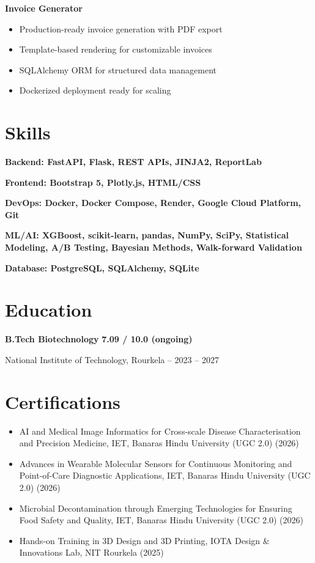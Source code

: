 \documentclass[11pt,a4paper]{article}
\begin{document}
\noindent\textbf{Invoice Generator} \hfill \href{https://github.com/jiyanshusingh/invoice-generator}{\faGithub}
\begin{itemize}
    \item Production-ready invoice generation with PDF export
    \item Template-based rendering for customizable invoices
    \item SQLAlchemy ORM for structured data management
    \item Dockerized deployment ready for scaling
\end{itemize}

\section*{Skills}
\noindent\textbf{Backend: FastAPI, Flask, REST APIs, JINJA2, ReportLab}

\noindent\textbf{Frontend: Bootstrap 5, Plotly.js, HTML/CSS}

\noindent\textbf{DevOps: Docker, Docker Compose, Render, Google Cloud Platform, Git}

\noindent\textbf{ML/AI: XGBoost, scikit-learn, pandas, NumPy, SciPy, Statistical Modeling, A/B Testing, Bayesian Methods, Walk-forward Validation}

\noindent\textbf{Database: PostgreSQL, SQLAlchemy, SQLite}

\section*{Education}
\noindent\textbf{B.Tech Biotechnology} \hfill \textbf{7.09 / 10.0 (ongoing)}

\noindent National Institute of Technology, Rourkela -- 2023 – 2027

\section*{Certifications}
\begin{itemize}
    \item AI and Medical Image Informatics for Cross-scale Disease Characterisation and Precision Medicine, IET, Banaras Hindu University (UGC 2.0) (2026)
    \item Advances in Wearable Molecular Sensors for Continuous Monitoring and Point-of-Care Diagnostic Applications, IET, Banaras Hindu University (UGC 2.0) (2026)
    \item Microbial Decontamination through Emerging Technologies for Ensuring Food Safety and Quality, IET, Banaras Hindu University (UGC 2.0) (2026)
    \item Hands-on Training in 3D Design and 3D Printing, IOTA Design \& Innovations Lab, NIT Rourkela (2025)
\end{itemize}
\end{document}
